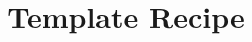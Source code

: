 \documentclass[11pt,a4paper]{article}
\title{Template Recipe}
\author{}
\date{}
\begin{document}
\maketitle

\pagebreak

\end{document}
